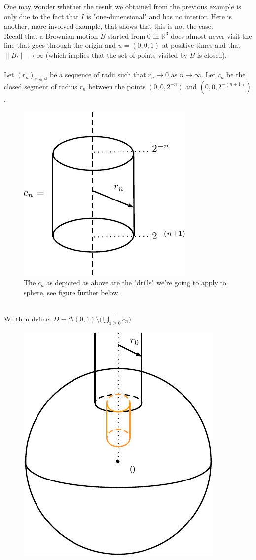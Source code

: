 \documentclass[../mainfile.tex]{subfiles}
\begin{document}
\begin{exmp} One may wonder whether the result we obtained from the previous example is only due to the fact that $I$ is "one-dimensional" and has no interior. Here is another, more involved example, that shows that this is not the case. \\
Recall that a Brownian motion $B$ started from $0$ in $\mathbb{R}^3$ does almost never visit the line that goes through the origin and $u=(0,0,1)$ at positive times and that  $\|B_t\| \to \infty$ (which implies that the set of points visited by $B$ is closed).
\\\\
Let $(r_n)_{n \in \mathbb{N}}$ be a sequence of radii such that $r_n \to 0$ as $n \to \infty$. Let $c_n$ be the closed segment of radius $r_n$ between the points $(0,0,2^{-n})$ and $(0,0,2^{-(n+1)})$. 
\begin{figure}[hbtp]
\centering
\includegraphics[scale=.9]{ceen.pdf}
\caption{The $c_n$ as depicted as above are the "drills" we're going to apply to sphere,  see figure further below. }
\end{figure} \\
We then define: $D= \mathcal{B}(0,1) \setminus \Big( \overline{\bigcup_{n \geq 0 } c_n} \Big)$
\begin{figure}[hbtp]
\centering
\includegraphics[scale=.70]{drilling.pdf}

\end{figure}
\end{exmp}
\end{document}
